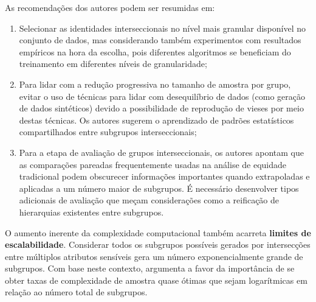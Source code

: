 As recomendações dos autores podem ser resumidas em:
\begin{enumerate}
    \item Selecionar as identidades interseccionais no nível mais granular disponível no conjunto de dados, mas considerando também experimentos com resultados empíricos na hora da escolha, pois diferentes algoritmos se beneficiam do treinamento em diferentes níveis de granularidade;
    \item Para lidar com a redução progressiva no tamanho de amostra por grupo, evitar o uso de técnicas para lidar com desequilíbrio de dados (como geração de dados sintéticos) devido a possibilidade de reprodução de vieses por meio destas técnicas. Os autores sugerem o aprendizado de padrões estatísticos compartilhados entre subgrupos interseccionais;
    \item Para a etapa de avaliação de grupos interseccionais, os autores apontam que as comparações pareadas frequentemente usadas na análise de equidade tradicional podem obscurecer informações importantes quando extrapoladas e aplicadas a um número maior de subgrupos. É necessário desenvolver tipos adicionais de avaliação que meçam considerações como a reificação de hierarquias existentes entre subgrupos.
\end{enumerate}

O aumento inerente da complexidade computacional também acarreta \textbf{limites de escalabilidade}. Considerar todos os subgrupos possíveis gerados por intersecções entre múltiplos atributos sensíveis gera um número exponencialmente grande de subgrupos. Com base neste contexto, \citet{deng2024multi} argumenta a favor da importância de se obter taxas de complexidade de amostra quase ótimas que sejam logarítmicas em relação ao número total de subgrupos.%


